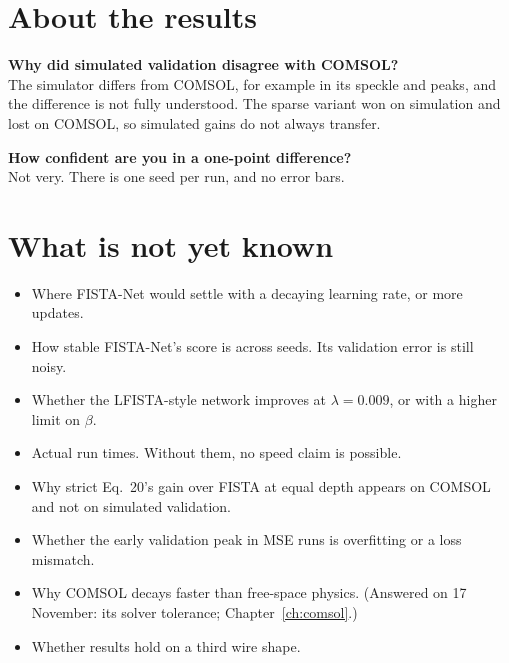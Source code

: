 \section{About the results}

\textbf{Why did simulated validation disagree with COMSOL?}\\
The simulator differs from COMSOL, for example in its speckle and peaks, and the difference is not fully understood.
The sparse variant won on simulation and lost on COMSOL, so simulated gains do not always transfer.

\textbf{How confident are you in a one-point difference?}\\
Not very. There is one seed per run, and no error bars.

\section{What is not yet known}

\begin{itemize}
\item Where FISTA-Net would settle with a decaying learning rate, or more updates.
\item How stable FISTA-Net's score is across seeds. Its validation error is still noisy.
\item Whether the LFISTA-style network improves at $\lambda=0.009$, or with a higher limit on $\beta$.
\item Actual run times. Without them, no speed claim is possible.
\item Why strict Eq.~20's gain over FISTA at equal depth appears on COMSOL and not on simulated validation.
\item Whether the early validation peak in MSE runs is overfitting or a loss mismatch.
\item Why COMSOL decays faster than free-space physics. (Answered on 17 November: its solver tolerance;
Chapter~\ref{ch:comsol}.)
\item Whether results hold on a third wire shape.
\end{itemize}
